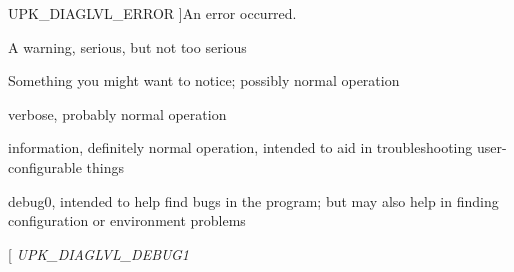 \begin{Desc}
\begin{description}
{UPK\_\-DIAGLVL\_\-ERROR\label{controller_2tp_8c_ga69a581dfd708ad2e18688e01cbcc0ff8a554508c4755c0b5a7254b5032c8220d2}
}]An error occurred. \item[{\em 
UPK\_\-DIAGLVL\_\-WARN\label{controller_2tp_8c_ga69a581dfd708ad2e18688e01cbcc0ff8a28fff8a74dfb72e3c0fad13c8fcd6168}
}]A warning, serious, but not too serious \item[{\em 
UPK\_\-DIAGLVL\_\-NOTICE\label{controller_2tp_8c_ga69a581dfd708ad2e18688e01cbcc0ff8a2d096c4906e4df530e7b2368d0169558}
}]Something you might want to notice; possibly normal operation \item[{\em 
UPK\_\-DIAGLVL\_\-VERBOSE\label{controller_2tp_8c_ga69a581dfd708ad2e18688e01cbcc0ff8af4ab159278a3a1599c370e89858ec888}
}]verbose, probably normal operation \item[{\em 
UPK\_\-DIAGLVL\_\-INFO\label{controller_2tp_8c_ga69a581dfd708ad2e18688e01cbcc0ff8a2bb69eb89e08c5587c87186e04b0aaa8}
}]information, definitely normal operation, intended to aid in troubleshooting user-\/configurable things \item[{\em 
UPK\_\-DIAGLVL\_\-DEBUG0\label{controller_2tp_8c_ga69a581dfd708ad2e18688e01cbcc0ff8af6a6be2812d975c859910213b5361e39}
}]debug0, intended to help find bugs in the program; but may also help in finding configuration or environment problems \item[{\em 
UPK\_\-DIAGLVL\_\-DEBUG1\label{controller_2tp_8c_ga69a581dfd708ad2e18688e01cbcc0ff8a77aa4e5c1c3416dea8d1e7299aaa1530}
}
\end{description}
\end{Desc}
